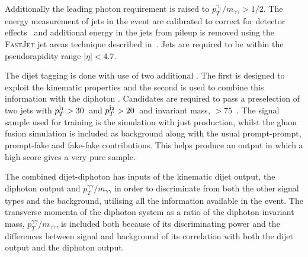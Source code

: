 Additionally the leading photon \pT requirement is raised to $p_{T}^{\gamma_{1}}/m_{\gamma\gamma}>1/2$. The energy measurement of jets in the event are calibrated to correct for detector effects~\cite{jet_energy_corrections} and additional energy in the jets from pileup is removed using the \textsc{FastJet} jet areas technique described in~\cite{pu_jets1,pu_jets2,pu_jets3}. Jets are required to be within the pseudorapidity range $|\eta|<4.7$.

The dijet tagging is done with use of two additional \MVAs. The first is designed to exploit the \VBF kinematic properties and the second is used to combine this information with the diphoton \BDT. Candidates are required to pass a \VBF preselection of two jets with $p_{T}^{\mathrm{j}_{1}}>30$~\GeV and $p_{T}^{\mathrm{j}_{2}}>20$~\GeV and invariant mass, \mjj$>75$~\GeV. The signal sample used for training is the \SM \MC simulation with just \VBF production, whilst the \SM gluon fusion \MC simulation is included as background along with the usual prompt-prompt, prompt-fake and fake-fake contributions. This helps produce an output in which a high score gives a very pure \VBF sample.

The combined dijet-diphoton \BDT has inputs of the kinematic dijet \BDT output, the diphoton \BDT output and $p_{T}^{\gamma\gamma}/m_{\gamma\gamma}$ in order to discriminate \VBF from both the other signal types and the background, utilising all the information available in the event. The transverse momenta of the diphoton system as a ratio of the diphoton invariant mass, $p_{T}^{\gamma\gamma}/m_{\gamma\gamma}$, is included both because of its discriminating power and the differences between signal and background of its correlation with both the dijet \BDT output and the diphoton \BDT output.


